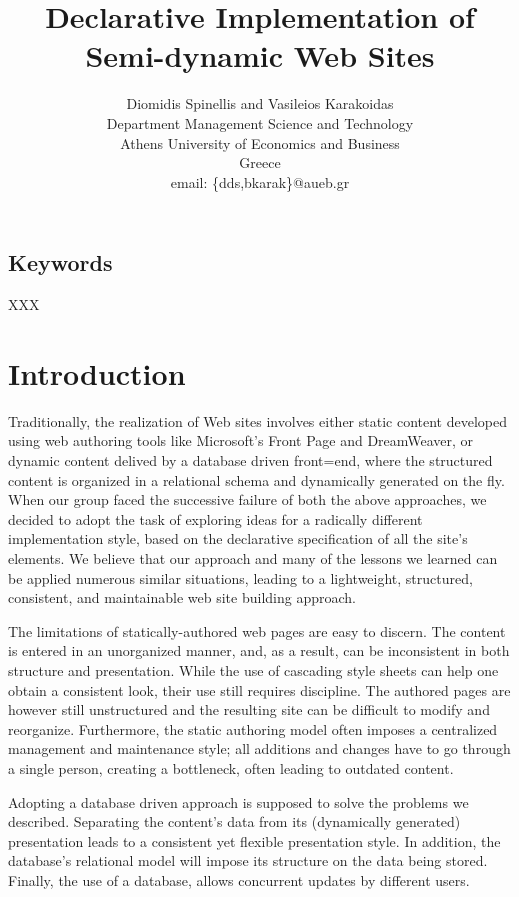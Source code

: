\documentclass[10pt]{article}
\title{Declarative Implementation of Semi-dynamic Web Sites}
\author{Diomidis Spinellis and Vasileios Karakoidas\\
Department Management Science and Technology \\
Athens University of Economics and Business \\
Greece\\
email: \{dds,bkarak\}@aueb.gr}
\date{}
\begin{document}
\maketitle

\begin{abstract}
\end{abstract}

\subsection*{Keywords}
XXX

\section{Introduction}
\label{sec:intro}
Traditionally, the realization of Web sites involves either
static content developed using web authoring tools like
Microsoft's Front Page and DreamWeaver, or dynamic
content delived by a database driven front=end,
where the structured content is organized
in a relational schema and dynamically generated on the fly.
When our group faced the successive failure of both the above approaches,
we decided to adopt the task of exploring ideas for a radically different
implementation style, based on the declarative specification
of all the site's elements.
We believe that our approach and many of the lessons we learned
can be applied numerous similar situations,
leading to a lightweight, structured, consistent, and maintainable
web site building approach.

The limitations of statically-authored web pages are easy to discern.
The content is entered in an unorganized manner, and, as a result,
can be inconsistent in both structure and presentation.
While the use of cascading style sheets can help one obtain a
consistent look, their use still requires discipline.
The authored pages are however still unstructured and the resulting
site can be difficult to modify and reorganize.
Furthermore, the static authoring model often imposes a centralized
management and maintenance style;
all additions and changes have to go through a single person,
creating a bottleneck, often leading to outdated content.

Adopting a database driven approach is supposed to
solve the problems we described.
Separating the content's data from its (dynamically generated)
presentation leads to a consistent
yet flexible presentation style.
In addition, the database's relational model will impose
its structure on the data being stored.
Finally, the use of a database, allows concurrent updates by
different users.
\end{document}
